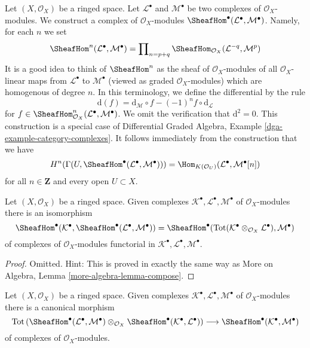 \noindent
Let $(X, \mathcal{O}_X)$ be a ringed space. Let
$\mathcal{L}^\bullet$ and $\mathcal{M}^\bullet$ be two complexes
of $\mathcal{O}_X$-modules. We construct a complex
of $\mathcal{O}_X$-modules
$\SheafHom^\bullet(\mathcal{L}^\bullet, \mathcal{M}^\bullet)$.
Namely, for each $n$ we set
$$
\SheafHom^n(\mathcal{L}^\bullet, \mathcal{M}^\bullet) =
\prod\nolimits_{n = p + q}
\SheafHom_{\mathcal{O}_X}(\mathcal{L}^{-q}, \mathcal{M}^p)
$$
It is a good idea to think of $\SheafHom^n$ as the
sheaf of $\mathcal{O}_X$-modules of all $\mathcal{O}_X$-linear
maps from $\mathcal{L}^\bullet$ to $\mathcal{M}^\bullet$
(viewed as graded $\mathcal{O}_X$-modules) which are homogenous
of degree $n$. In this terminology, we define the differential by the rule
$$
\text{d}(f) =
\text{d}_\mathcal{M} \circ f - (-1)^n f \circ \text{d}_\mathcal{L}
$$
for
$f \in \SheafHom^n_{\mathcal{O}_X}(\mathcal{L}^\bullet, \mathcal{M}^\bullet)$.
We omit the verification that $\text{d}^2 = 0$.
This construction is a special case of
Differential Graded Algebra, Example \ref{dga-example-category-complexes}.
It follows immediately from the construction that we have
\begin{equation}
\label{equation-cohomology-hom-complex}
H^n(\Gamma(U, \SheafHom^\bullet(\mathcal{L}^\bullet, \mathcal{M}^\bullet))) =
\Hom_{K(\mathcal{O}_U)}(\mathcal{L}^\bullet, \mathcal{M}^\bullet[n])
\end{equation}
for all $n \in \mathbf{Z}$ and every open $U \subset X$.

\begin{lemma}
\label{lemma-compose}
Let $(X, \mathcal{O}_X)$ be a ringed space.
Given complexes $\mathcal{K}^\bullet, \mathcal{L}^\bullet, \mathcal{M}^\bullet$
of $\mathcal{O}_X$-modules there is an isomorphism
$$
\SheafHom^\bullet(\mathcal{K}^\bullet,
\SheafHom^\bullet(\mathcal{L}^\bullet, \mathcal{M}^\bullet))
=
\SheafHom^\bullet(\text{Tot}(\mathcal{K}^\bullet \otimes_{\mathcal{O}_X}
\mathcal{L}^\bullet), \mathcal{M}^\bullet)
$$
of complexes of $\mathcal{O}_X$-modules functorial in
$\mathcal{K}^\bullet, \mathcal{L}^\bullet, \mathcal{M}^\bullet$.
\end{lemma}

\begin{proof}
Omitted. Hint: This is proved in exactly the same way as
More on Algebra, Lemma \ref{more-algebra-lemma-compose}.
\end{proof}

\begin{lemma}
\label{lemma-composition}
Let $(X, \mathcal{O}_X)$ be a ringed space. Given complexes
$\mathcal{K}^\bullet, \mathcal{L}^\bullet, \mathcal{M}^\bullet$
of $\mathcal{O}_X$-modules there is a canonical morphism
$$
\text{Tot}\left(
\SheafHom^\bullet(\mathcal{L}^\bullet, \mathcal{M}^\bullet)
\otimes_{\mathcal{O}_X}
\SheafHom^\bullet(\mathcal{K}^\bullet, \mathcal{L}^\bullet)
\right)
\longrightarrow
\SheafHom^\bullet(\mathcal{K}^\bullet, \mathcal{M}^\bullet)
$$
of complexes of $\mathcal{O}_X$-modules.
\end{lemma}

